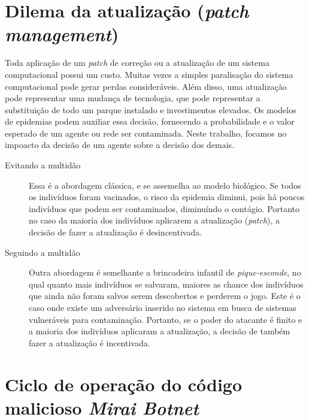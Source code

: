 \section{Dilema da atualização (\emph{patch management})}
	Toda aplicação de um \emph{patch} de correção ou a atualização de um sistema computacional possui um custo.  Muitas vezes a simples paralisação do sistema computacional pode gerar perdas consideráveis. Além disso, uma atualização pode representar uma mudança de tecnologia, que pode representar a substituição de todo um parque instalado e investimentos  elevados. Os modelos de epidemias podem auxiliar essa decisão, fornecendo a probabilidade e o valor esperado de um agente ou rede ser contaminada.  Neste trabalho, focamos no impoacto da decisão de um agente sobre a decisão dos demais. 
%
	\begin{description}
		\item[Evitando a multidão] Essa é a abordagem clássica, e se assemelha ao modelo biológico. Se todos os indivíduos foram vacinados, o risco da epidemia diminui, pois há poucos indivíduos que podem ser contaminados, diminuíndo o contágio. Portanto no caso da maioria dos indivíduos aplicarem a atualização (\textit{patch}), a decisão de fazer a atualização é desincentivada.
		\item[Seguindo a multidão] Outra abordagem é semelhante a brincadeira infantil de \textit{pique-esconde}, no qual quanto mais indivíduos se salvaram, maiores  as chance dos indivíduos que ainda não foram salvos serem descobertos e perderem o jogo. Este é o caso onde existe um adversário inserido no sistema em busca de sistemas vulneráveis para contaminação. Portanto, se o poder do atacante é finito e a maioria dos indivíduos aplicaram a atualização, a decisão de também fazer a atualização é incentivada.
	\end{description}

\section{Ciclo de operação do código malicioso \textit{Mirai Botnet}}

